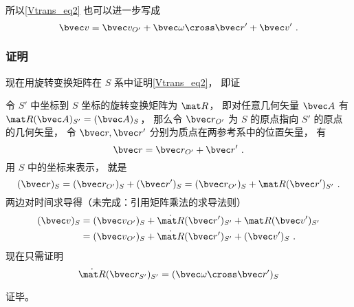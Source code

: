 所以\autoref{Vtrans_eq2} 也可以进一步写成
\begin{equation}
\bvec v = \bvec v_{O'} + \bvec \omega \cross \bvec r' + \bvec v'~.
\end{equation}

\subsubsection{证明}
现在用旋转变换矩阵在 $S$ 系中证明\autoref{Vtrans_eq2}， 即证

令 $S'$ 中坐标到 $S$ 坐标的旋转变换矩阵为 $\mat R$， 即对任意几何矢量 $\bvec A$ 有 $\mat R (\bvec A)_{S'} = (\bvec A)_S$， 那么令 $\bvec r_{O'}$ 为 $S$ 的原点指向 $S'$ 的原点的几何矢量， 令 $\bvec r, \bvec r'$ 分别为质点在两参考系中的位置矢量， 有
\begin{equation}
\bvec r = \bvec r_{O'} + \bvec r'~.
\end{equation}
用 $S$ 中的坐标来表示， 就是
\begin{equation}
(\bvec r)_S = (\bvec r_{O'})_S + (\bvec r')_S = (\bvec r_{O'})_S + \mat R(\bvec r')_{S'}~.
\end{equation}
两边对时间求导得（未完成：引用矩阵乘法的求导法则）
\begin{equation}
\begin{aligned}
(\bvec v)_S &= ({\bvec v}_{O'})_S + \dot{\mat R}(\bvec r')_{S'} + \mat R (\bvec v')_{S'}\\
&= ({\bvec v}_{O'})_S + \dot{\mat R}(\bvec r')_{S'} + (\bvec v')_S~.
\end{aligned}
\end{equation}
现在只需证明
\begin{equation}
\dot{\mat R}(\bvec r_{S'})_{S'} = (\bvec \omega \cross \bvec r')_S
\end{equation}


证毕。
